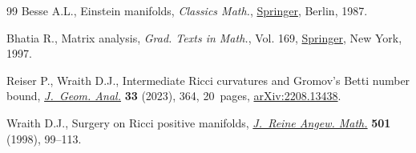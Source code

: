 \documentclass[11pt]{article}
\numberwithin{equation}{section}
\numberwithin{equation}{section}
\begin{document}
\begin{thebibliography}{99}
Besse A.L., Einstein manifolds, \textit{Classics Math.}, \href{https://doi.org/10.1007/978-3-540-74311-8}{Springer}, Berlin, 1987.

Bhatia R., Matrix analysis, \textit{Grad. Texts in Math.}, Vol. 169, \href{https://doi.org/10.1007/978-1-4612-0653-8}{Springer},
 New York, 1997.

Reiser P., Wraith D.J., Intermediate {R}icci curvatures and {G}romov's {B}etti
 number bound, \href{https://doi.org/10.1007/s12220-023-01423-6}{\textit{J.~Geom. Anal.}} \textbf{33} (2023), 364, 20~pages,
 \href{https://arxiv.org/abs/2208.13438}{arXiv:2208.13438}.

Wraith D.J., Surgery on {R}icci positive manifolds, \href{https://doi.org/10.1515/crll.1998.082}{\textit{J.~Reine Angew.
 Math.}} \textbf{501} (1998), 99--113.

\end{thebibliography}
\end{document}
